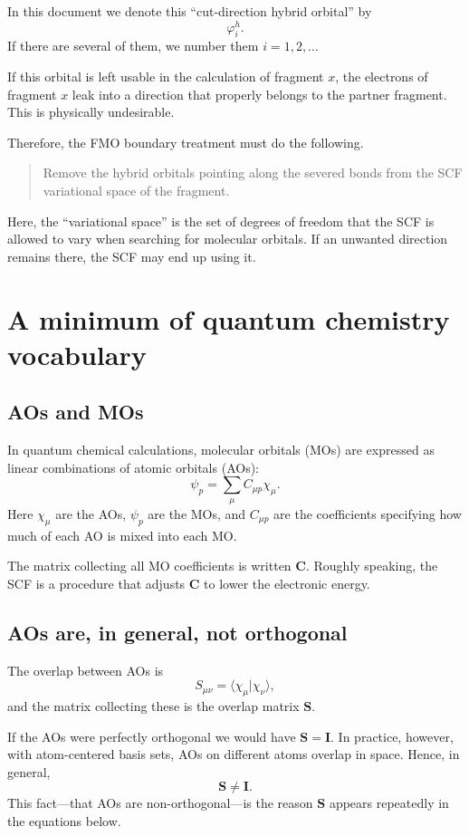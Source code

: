 \documentclass[11pt]{article}
\newcommand{\Smat}{\mathbf S}
\newcommand{\Cmat}{\mathbf C}
\begin{document}
In this document we denote this ``cut-direction hybrid orbital'' by
\[
  \varphi_i^h .
\]
If there are several of them, we number them \(i=1,2,\ldots\)

If this orbital is left usable in the calculation of fragment \(x\),
the electrons of fragment \(x\) leak into a direction that properly
belongs to the partner fragment. This is physically undesirable.

Therefore, the FMO boundary treatment must do the following.

\begin{quote}
Remove the hybrid orbitals pointing along the severed bonds from the
SCF variational space of the fragment.
\end{quote}

Here, the ``variational space'' is the set of degrees of freedom that
the SCF is allowed to vary when searching for molecular orbitals. If an
unwanted direction remains there, the SCF may end up using it.

\section{A minimum of quantum chemistry vocabulary}

\subsection{AOs and MOs}

In quantum chemical calculations, molecular orbitals (MOs) are
expressed as linear combinations of atomic orbitals (AOs):
\[
  \psi_p = \sum_\mu C_{\mu p}\chi_\mu .
\]
Here \(\chi_\mu\) are the AOs, \(\psi_p\) are the MOs, and
\(C_{\mu p}\) are the coefficients specifying how much of each AO is
mixed into each MO.

The matrix collecting all MO coefficients is written \(\Cmat\).
Roughly speaking, the SCF is a procedure that adjusts \(\Cmat\) to
lower the electronic energy.

\subsection{AOs are, in general, not orthogonal}

The overlap between AOs is
\[
  S_{\mu\nu} = \langle \chi_\mu | \chi_\nu \rangle ,
\]
and the matrix collecting these is the overlap matrix \(\Smat\).

If the AOs were perfectly orthogonal we would have
\(\Smat=\mathbf I\). In practice, however, with atom-centered basis
sets, AOs on different atoms overlap in space. Hence, in general,
\[
  \Smat \ne \mathbf I .
\]
This fact---that AOs are non-orthogonal---is the reason \(\Smat\)
appears repeatedly in the equations below.
\end{document}
